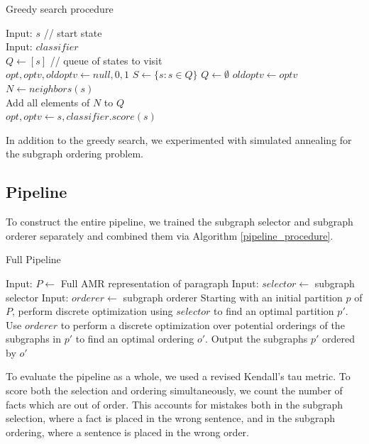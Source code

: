 \documentclass[12pt]{article}
\begin{document}
\begin{algorithm}
\caption{Greedy search procedure}
\label{greedy_search_alg}
\begin{algorithmic}
\STATE Input: $s$ // start state \\
\STATE Input: $classifier$ \\
\STATE $Q \gets [s]$ // queue of states to visit \\
\STATE $opt, optv, oldoptv \gets null, 0, 1$
    \STATE $S \gets \{s: s \in Q \}$
    \STATE $Q \gets \emptyset$
    \STATE $oldoptv \gets optv$
        \STATE $N \gets neighbors(s)$\\
        \STATE Add all elements of $N$ to $Q$\\
            \STATE $opt, optv \gets s, classifier.score(s)$\\
        \ENDIF
    \ENDFOR
\ENDWHILE
\end{algorithmic}
\end{algorithm}

In addition to the greedy search, we experimented with simulated annealing for the
subgraph ordering problem.

\subsection{Pipeline}

To construct the entire pipeline, we trained the subgraph selector and subgraph
orderer separately and combined them via Algorithm \ref{pipeline_procedure}.

\begin{algorithm}
\caption{Full Pipeline}
\label{pipeline_procedure}
\begin{algorithmic}
\STATE Input: $P \gets$ Full AMR representation of paragraph
\STATE Input: $selector \gets$ subgraph selector
\STATE Input: $orderer \gets$ subgraph orderer
\STATE Starting with an initial partition $p$ of $P$, perform discrete
optimization using $selector$ to find an optimal partition $p'$.
\STATE Use $orderer$ to perform a discrete optimization over potential
orderings of the subgraphs in $p'$ to find an optimal ordering $o'$.
\STATE Output the subgraphs $p'$ ordered by $o'$
\end{algorithmic}
\end{algorithm}

To evaluate the pipeline as a whole, we used a revised Kendall's tau metric. 
To score both the selection and ordering simultaneously, we count the number of facts which are out of order.
This accounts for mistakes both in the subgraph selection, where a fact is
placed in the wrong sentence, and in the subgraph ordering, where a sentence
is placed in the wrong order.
\end{document}
